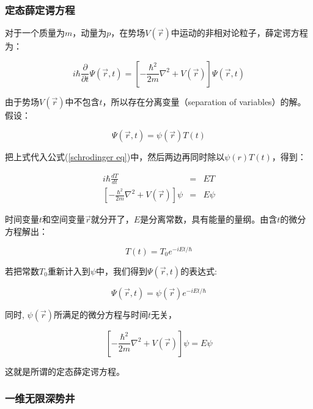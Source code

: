 \subsubsection{定态薛定谔方程}

对于一个质量为$m$，动量为$p$，在势场$V(\vec
r)$中运动的非相对论粒子，薛定谔方程为：

\begin{equation}
i \hbar \frac{\partial}{\partial t} \Psi(\vec r,t)=\left[-
\frac{\hbar^2}{2m}\nabla^2  + V(\vec r)\right]\Psi(\vec r,t)
\label{schrodinger eq}
\end{equation}

由于势场$V(\vec r)$中不包含$t$，所以存在分离变量（separation of variables）的解。假设：

\begin{equation}
\Psi(\vec r,t)=\psi(\vec r)T(t)
\end{equation}

把上式代入公式(\ref{schrodinger eq})中，然后两边再同时除以$\psi(r)T(t)$，得到：

\begin{eqnarray}
  i \hbar \frac{dT}{dt} &=& E T \\
  \left[ - \frac{\hbar^2}{2m}\nabla^2 + V(\vec r) \right] \psi &=& E \psi
\end{eqnarray}

时间变量$t$和空间变量$\vec r$就分开了，$E$是分离常数，具有能量的量纲。由含$t$的微分方程解出：

\begin{equation*}
T(t) = T_0 e^{-iEt/\hbar}
\end{equation*}

若把常数$T_0$重新计入到$\psi$中，我们得到$\Psi(\vec r,t)$的表达式:

\begin{equation*}
\Psi(\vec r,t)=\psi(\vec r) e^{-iEt/\hbar}
\end{equation*}

同时, $\psi(\vec r)$所满足的微分方程与时间$t$无关，

\begin{equation}
\left[ - \frac{\hbar^2}{2m}\nabla^2 + V(\vec r) \right] \psi = E
\psi
\label{stationary state schodinger eq}
\end{equation}

这就是所谓的定态薛定谔方程。

\subsubsection{一维无限深势井}

